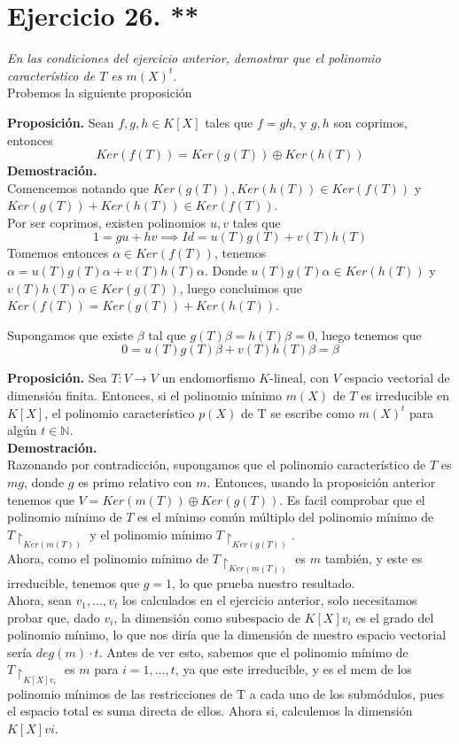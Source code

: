 \section{Ejercicio 26. **} \textit{En las condiciones del ejercicio anterior,
  demostrar que el polinomio característico de \(T\) es \(m(X)^t\)}.\\

Probemos la siguiente proposición

\textbf{Proposición. }Sean \(f,g,h \in K[X]\) tales que \(f = gh\), y \(g,h\) son
coprimos, entonces
\[
  Ker(f(T)) = Ker(g(T)) \oplus Ker(h(T))
\]
\textbf{Demostración.}\\
Comencemos notando que \(Ker(g(T)), Ker(h(T)) \in Ker(f(T))\) y \(Ker(g(T)) +
Ker(h(T)) \in Ker(f(T))\).\\ Por ser coprimos, existen polinomios \(u,v\) tales
que
\[
  1 = gu + hv \implies Id = u(T)g(T) + v(T)h(T)
\]
Tomemos entonces \(\alpha \in Ker(f(T))\), tenemos \(\alpha = u(T)g(T)\alpha +
v(T)h(T)\alpha\).
Donde  \( u(T)g(T)\alpha \in Ker(h(T))\) y  \( v(T)h(T)\alpha \in Ker(g(T))\),
luego concluimos que \(Ker(f(T)) = Ker(g(T)) + Ker(h(T))\).

Supongamos que existe \(\beta\) tal que \(g(T)\beta = h(T)\beta = 0\), luego
tenemos que
\[
  0 = u(T)g(T)\beta + v(T)h(T)\beta = \beta
\]

\textbf{Proposición.} Sea \(T: V \rightarrow V \) un endomorfismo \(K\)-lineal, con \(V\) espacio vectorial de dimensión finita. Entonces, si el polinomio mínimo \(m(X)\) de  \(T\) es irreducible en  \(K[X]\), el polinomio característico \(p(X)\) de T se escribe como \(m(X)^t\) para algún \(t \in \mathbb{N}\).\\

\textbf{Demostración.}\\
Razonando por contradicción, supongamos que el polinomio característico de \(T\) es  \(mg\), donde  \(g\) es primo relativo con \(m\). Entonces, usando la proposición anterior tenemos que \(V = Ker(m(T)) \oplus Ker(g(T))\). Es facil comprobar que el polinomio mínimo de \(T\) es el mínimo común múltiplo del polinomio mínimo de \(T\restriction_{Ker(m(T))}\) y el polinomio mínimo \(T\restriction_{Ker(g(T))}\).\\

Ahora, como el polinomio mínimo de \(T\restriction_{Ker(m(T))}\) es \(m\) también, y este es irreducible, tenemos que \(g = 1\), lo que prueba nuestro resultado.\\

Ahora, sean \(v_1, \dots, v_t\) los calculados en el ejercicio anterior, solo necesitamos probar que, dado \(v_i\), la dimensión como subespacio de \(K[X]v_i\) es el grado del polinomio mínimo, lo que nos diría que la dimensión de nuestro espacio vectorial sería \(deg(m) \cdot t\). Antes de ver esto, sabemos que el polinomio mínimo de \(T\restriction_{K[X]v_i}\) es \(m\) para \(i = 1, \dots, t\), ya que este irreducible, y es el mcm de los polinomio mínimos de las restricciones de T a cada uno de los submódulos, pues el espacio total es suma directa de ellos. Ahora si, calculemos la dimensión \(K[X]vi\).\\

